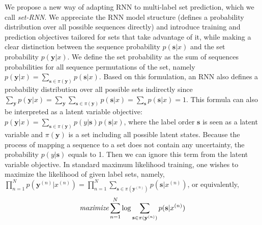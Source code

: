 We propose a new way of adapting RNN to multi-label set prediction, which we call \emph{set-RNN}. We appreciate the RNN model structure \cite{rumelhart1988learning} (defines a probability distribution over all possible sequences directly) and introduce training and prediction objectives tailored for sets that take advantage of it, while making a clear distinction between the sequence probability $p(\mathbf{s}|x)$ and the set probability $p(\mathbf{y}|x)$. 
 We define the set probability as the sum of sequences probabilities for all sequence permutations of the set, namely $p(\mathbf{y}|x)=\sum_{\mathbf{s}\in \pi(\mathbf{y})} p(\mathbf{s}|x)$. Based on this formulation, an RNN also defines a probability distribution over all possible sets indirectly since $\sum_{\mathbf{y}} p(\mathbf{y}|x)=\sum_{\mathbf{y}}\sum_{\mathbf{s}\in \pi(\mathbf{y})} p(\mathbf{s}|x)=\sum_{\mathbf{s}} p(\mathbf{s}|x)=1$. This formula can also be interpreted as a latent variable objective: $p(\mathbf{y}|x)=\sum_{\mathbf{s}\in \pi(\mathbf{y})} p(y|\mathbf{s})p(\mathbf{s}|x)$, where the label order $\mathbf{s}$ is seen as a latent variable and $\pi(\mathbf{y})$ is a set including all possible latent states. Because the process of mapping a sequence to a set does not contain any uncertainty, the probability $p(y|\mathbf{s})$ equals to 1. Then we can ignore this term from the latent variable objective. In standard maximum likelihood training, one wishes to maximize the likelihood of given label sets, namely, $\prod_{n=1}^N p(\mathbf{y}^{(n)}|x^{(n)})=\prod_{n=1}^N \sum_{\mathbf{s}\in \pi(\mathbf{y}^{(n)})} p(\mathbf{s}|x^{(n)})$, or equivalently, 
\begin{align}
\textit{maximize} \sum_{n=1}^N \log \sum_{\mathbf{s}\in \pi(\mathbf{y}^{(n)})} p(\mathbf{s}|x^{(n)})
\label{eq:right_obj}
\end{align}


